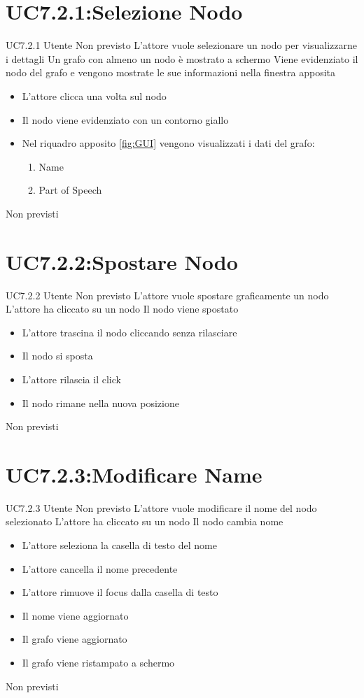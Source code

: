 \documentclass[../AnalisideiRequisiti.tex]{subfiles}
\begin{document}
\section{UC7.2.1:Selezione Nodo}
\UserCase
{UC7.2.1}
{Utente}
{Non previsto}
{L'attore vuole selezionare un nodo per visualizzarne i dettagli}
{Un grafo con almeno un nodo è mostrato a schermo}
{Viene evidenziato il nodo del grafo e vengono mostrate le sue informazioni nella finestra apposita}
{
	\begin{itemize}
		\item{} L'attore clicca una volta sul nodo
		\item{} Il nodo viene evidenziato con un contorno giallo
		\item{} Nel riquadro apposito \ref{fig:GUI} vengono visualizzati i dati del grafo:
		\begin{enumerate}
			\item{} Name
			\item{} Part of Speech
		\end{enumerate}
	\end{itemize}
}
{Non previsti}
\section{UC7.2.2:Spostare Nodo}
\UserCase
{UC7.2.2}
{Utente}
{Non previsto}
{L'attore vuole spostare graficamente un nodo}
{L'attore ha cliccato su un nodo }
{Il nodo viene spostato}
{
	\begin{itemize}
		\item{} L'attore trascina il nodo cliccando senza rilasciare
		\item{} Il nodo si sposta
		\item{} L'attore rilascia il click
		\item{} Il nodo rimane nella nuova posizione
	\end{itemize}
}
{Non previsti}

\section{UC7.2.3:Modificare Name}
\UserCase
{UC7.2.3}
{Utente}
{Non previsto}
{L'attore vuole modificare il nome del nodo selezionato}
{L'attore ha cliccato su un nodo }
{Il nodo cambia nome}
{
	\begin{itemize}
		\item{} L'attore seleziona la casella di testo del nome
		\item{} L'attore cancella il nome precedente
		\item{} L'attore rimuove il focus dalla casella di testo
		\item{} Il nome viene aggiornato
		\item{} Il grafo viene aggiornato 
		\item{} Il grafo viene ristampato a schermo 
	\end{itemize}
}
{Non previsti}
\end{document}
